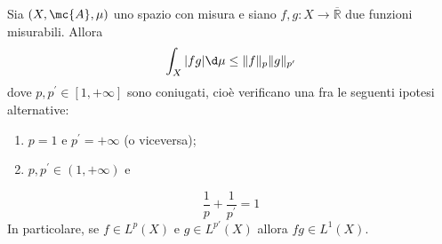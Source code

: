 \begin{shadedTheorem}\label{thm: 3.2 holder}
    Sia $(X, \mc{A}, \mu)$ uno spazio con misura e siano $f, g: X \rightarrow \overline{\mathbb{R}}$ due funzioni misurabili. Allora
    \[
    \int_{X}|f g| \d \mu \leq\|f\|_{p}\|g\|_{p^{\prime}}
    \]
    dove $p, p^{\prime} \in[1,+\infty]$ sono coniugati, cioè verificano una fra le seguenti ipotesi alternative:
    \begin{enumerate}
        \item $p=1$ e $p^{\prime}=+\infty$ (o viceversa);
        \item  $p, p^{\prime} \in(1,+\infty)$ e
    \end{enumerate}
    \[
    \frac{1}{p}+\frac{1}{p^{\prime}}=1
    \]
    In particolare, se $f \in {L}^{p}(X)$ e $g \in  L^{p'}(X)$ allora $f g \in L^{1}(X)$.
\end{shadedTheorem}
